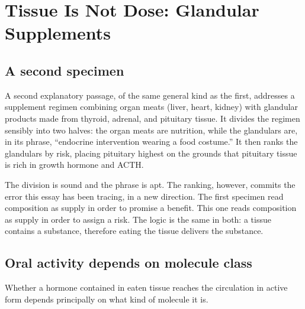 \documentclass[11pt,a4paper]{article}
\theoremstyle{plain}
\theoremstyle{definition}
\theoremstyle{remark}
\begin{document}
\section{Tissue Is Not Dose: Glandular Supplements}\label{sec:glandular}

\subsection{A second specimen}

A second explanatory passage, of the same general kind as the first, addresses a supplement regimen combining organ meats (liver, heart, kidney) with glandular products made from thyroid, adrenal, and pituitary tissue. It divides the regimen sensibly into two halves: the organ meats are nutrition, while the glandulars are, in its phrase, ``endocrine intervention wearing a food costume.'' It then ranks the glandulars by risk, placing pituitary highest on the grounds that pituitary tissue is rich in growth hormone and ACTH.

The division is sound and the phrase is apt. The ranking, however, commits the error this essay has been tracing, in a new direction. The first specimen read composition as supply in order to promise a benefit. This one reads composition as supply in order to assign a risk. The logic is the same in both: a tissue contains a substance, therefore eating the tissue delivers the substance.

\subsection{Oral activity depends on molecule class}

Whether a hormone contained in eaten tissue reaches the circulation in active form depends principally on what kind of molecule it is.
\end{document}
